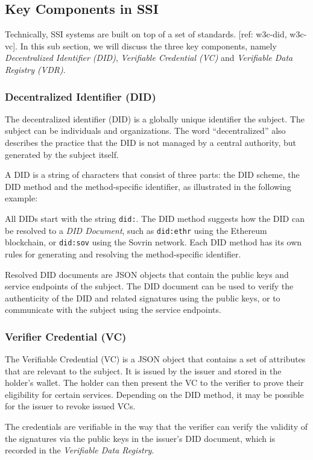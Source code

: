\documentclass[
]{report}
\begin{document}
\subsection{Key Components in SSI}
Technically, SSI systems are built on top of a set of standards. [ref: w3c-did, w3c-vc]. 
In this sub section, we will discuss the three key components, namely
\emph{Decentralized Identifier (DID)}, \emph{Verifiable Credential (VC)} and
\emph{Verifiable Data Registry (VDR)}.
\subsubsection{Decentralized Identifier (DID)}
The decentralized identifier (DID) is a globally unique identifier the subject.
The subject can be individuals and organizations. The word ``decentralized'' 
also describes the practice that the DID is not managed by a central authority,
but generated by the subject itself.

A DID is a string of characters that consist of three parts: the DID scheme,
the DID method and the method-specific identifier, as illustrated in the
following example:
\begin{figure}[h]
  
  \centering
\end{figure}
All DIDs start with the string \texttt{did:}. The DID method suggests how the
DID can be resolved to a \emph{DID Document}, such as \texttt{did:ethr} using
the Ethereum blockchain, or \texttt{did:sov} using the Sovrin network.
Each DID method has its own rules for generating and resolving the 
method-specific identifier.

Resolved DID documents are JSON objects that contain the public keys and service
endpoints of the subject. The DID document can be used to verify the authenticity
of the DID and related signatures using the public keys, or to communicate with
the subject using the service endpoints.
\subsubsection{Verifier Credential (VC)}
The Verifiable Credential (VC) is a JSON object that contains a set of attributes
that are relevant to the subject. It is issued by the issuer and stored in the
holder's wallet. The holder can then present the VC to the verifier to prove
their eligibility for certain services. Depending on the DID method, it may be
possible for the issuer to revoke issued VCs.

The credentials are verifiable in the way that the verifier can verify the
validity of the signatures via the public keys in the issuer's DID document,
which is recorded in the \emph{Verifiable Data Registry}.
\end{document}
